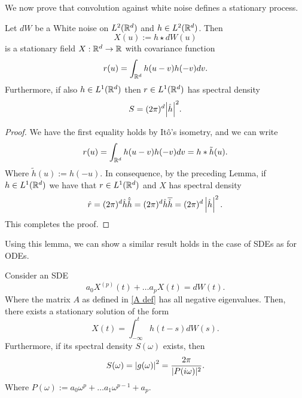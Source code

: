 \documentclass[
    a4paper,
    DIV=14,
    abstract=true,
    numbers=noenddot
]{scrartcl}
\begin{document}
We now prove that convolution against white noise defines a stationary process.
\begin{lemma}
	Let $dW$ be a White noise on $L^2(\mathbb{R}^d)$ and $h\in L^2(\mathbb{R}^d)$. Then $$X(u):=h\star dW(u)$$  is a  stationary field $X:\mathbb{R}^d\to\mathbb{R}$ with covariance function
	\begin{equation*}
		r(u)=\int_{\mathbb{R}^d} h(u-v)h(-v)dv.
	\end{equation*}
	Furthermore, if also $h\in L^1(\mathbb{R}^d)$ then $r\in L^1(\mathbb{R}^d)$ has spectral density
	\begin{equation*}        S=(2\pi)^d{\left| \hat{h} \right|^2}.
	\end{equation*}
\end{lemma}


\begin{proof}
	We have the first equality holds by Itô's isometry, and we can write
	\begin{equation*}
		r(u)=\int_{\mathbb{R}^d} h(u-v)h(-v)dv=h* \tilde{h}(u).
	\end{equation*}
	Where $\tilde{h}(u):=h(-u)$. In consequence, by the preceding Lemma, if $h\in L^1(\mathbb{R}^d)$ we have that $r\in L^1(\mathbb{R}^d)$ and $X$ has spectral density
	\begin{equation*}    \hat{r}=(2\pi)^d\hat{h}\hat{\tilde{h}}=(2\pi)^d\hat{h}\overline{\hat{h}}=(2\pi)^d\left| \hat{h} \right|^2.
	\end{equation*}
	This completes the proof.
\end{proof}
Using this lemma, we can show a similar result holds in the case of SDEs as for ODEs.
\begin{theorem}
	Consider an SDE     \begin{equation*}
		a_0X^{(p)}(t)+\ldots a_pX(t)=dW(t).
	\end{equation*}
	Where the matrix $A$ as defined in  \eqref{A def} has all negative eigenvalues. Then, there exists a stationary solution of the form $$X(t)=\int_{-\infty}^t h(t-s) dW(s).$$ Furthermore, if its spectral density $S(\omega)$ exists, then    \begin{equation*}
		S(\omega)={\left| g(\omega) \right|^2}=\frac{2\pi}{|P(i\omega)|^2}.
	\end{equation*}
	Where $P(\omega):=a_0\omega^p+\ldots a_{1}\omega^{p-1}+a_p$.
\end{theorem}
\end{document}
